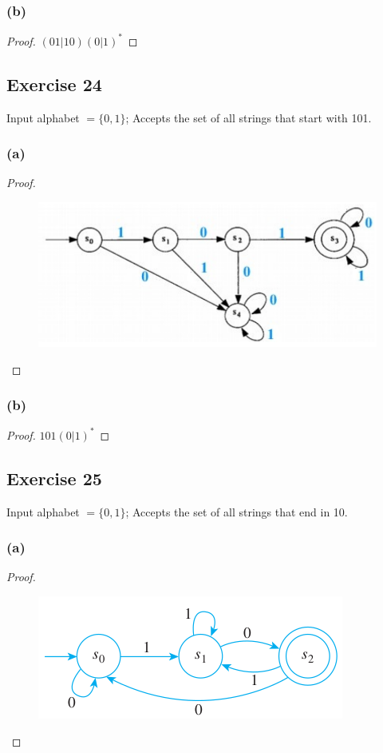 \documentclass[14pt]{extarticle}
\begin{document}
\subsubsection{(b)}
\begin{proof}
\((01|10)(0|1)^*\)
\end{proof}

\subsection{Exercise 24}
Input alphabet \(= \{0, 1\}\); Accepts the set of all strings that start with 101.

\subsubsection{(a)}

\begin{proof}
\begin{figure}[ht!]
\centering
\includegraphics[scale=0.4]{../images/12.2.24.a.png}
\end{figure}
\end{proof}

\subsubsection{(b)}

\begin{proof}
\(101(0|1)^*\)
\end{proof}

\subsection{Exercise 25}
Input alphabet \(= \{0, 1\}\); Accepts the set of all strings that end in 10.

\subsubsection{(a)}
\begin{proof}
\begin{figure}[ht!]
\centering
\includegraphics[scale=0.5]{../images/12.2.25.a.png}
\end{figure}
\end{proof}
\end{document}

